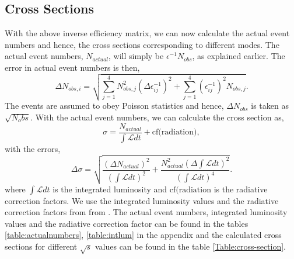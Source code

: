 \subsection{Cross Sections}
With the above inverse efficiency matrix, we can now calculate the actual event numbers and hence, the cross sections corresponding to different modes. The actual event numbers, $N_{actual}$, will simply be $\epsilon^{-1} N_{obs}$, as explained earlier. The error in actual event numbers is then,
\begin{equation}
    \Delta N_{obs, i} = \sqrt{\sum_{j=1}^4 N_{obs, j}^2 (\Delta \epsilon_{ij}^{-1})^2 + 
    \sum_{j=1}^4 (\epsilon_{ij}^{-1})^{2} N_{obs, j}}.
\end{equation}
The events are assumed to obey Poisson statistics and hence, $\Delta N_{obs}$ is taken as $\sqrt{N_obs}$. With the actual event numbers, we can calculate the cross section as,
\begin{equation}
    \sigma = \frac{N_{actual}}{\int \mathcal{L} dt} + \text{cf(radiation)},
\end{equation}
with the errors,
\begin{equation}
    \Delta \sigma = \sqrt{\frac{(\Delta N_{actual})^2}{(\int \mathcal{L} dt)^2} + 
    \frac{N_{actual}^2 (\Delta \int \mathcal{L} dt)^2}{(\int \mathcal{L} dt)^4}}.
\end{equation}
where $\int \mathcal{L} dt$ is the integrated luminosity and $\text{cf(radiation}$ is the radiative correction factors. We use the integrated luminosity values and the radiative correction factors from from \cite{UB}. The actual event numbers, integrated luminosity values and the radiative correction factor can be found in the tables \ref{table:actualnumbers}, \ref{table:intlum} in the appendix and the calculated cross sections for different $\sqrt{s}$ values can be found in the table \ref{Table:cross-section}.
